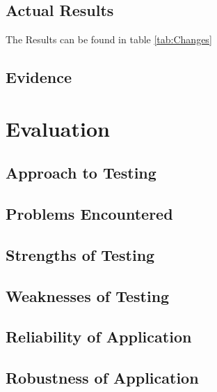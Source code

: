 \begin{landscape}
\subsection{Actual Results}
The Results can be found in table \ref{tab:Changes}
\subsection{Evidence}

\end{landscape}

\section{Evaluation}

\subsection{Approach to Testing}

\subsection{Problems Encountered}

\subsection{Strengths of Testing}

\subsection{Weaknesses of Testing}

\subsection{Reliability of Application}

\subsection{Robustness of Application}